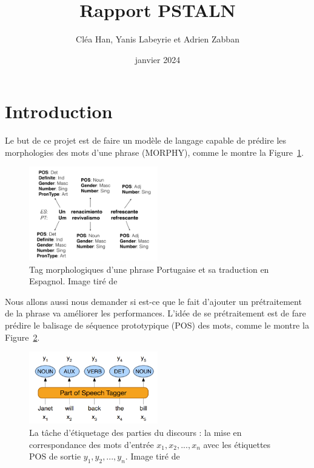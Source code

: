 \documentclass[a4paper]{article}
\title{Rapport PSTALN}
\author{Cléa Han, Yanis Labeyrie et Adrien Zabban}
\date{janvier 2024}
\begin{document}
\maketitle
\tableofcontents

\section{Introduction}

Le but de ce projet est de faire un modèle de langage capable de prédire les morphologies des mots d'une phrase
(MORPHY), comme le montre la Figure~\ref{fig: example morphy}.

\begin{figure}[H]
    \centering
    \includegraphics[width=0.5\textwidth]{morphy.png}
    \caption{Tag morphologiques d'une phrase Portugaise et sa traduction en Espagnol.
    Image tiré de~\cite{malaviya-etal-2018-neural}}
    \label{fig: example morphy}
\end{figure}    

Nous allons aussi nous demander si est-ce que le fait d'ajouter un prétraitement de la phrase va améliorer
les performances. L'idée de se prétraitement est de fare prédire le balisage de séquence
prototypique (POS) des mots, comme le montre la Figure~\ref{fig: example pos}.

\begin{figure}[H]
    \centering
    \includegraphics[width=0.5\textwidth]{pos.png}
    \caption{La tâche d'étiquetage des parties du discours : la mise en correspondance des mots d'entrée 
    $x_1, x_2,..., x_n$ avec les étiquettes POS de sortie $y_1, y_2,..., y_n$.
    Image tiré de~\cite{pos}}
    \label{fig: example pos}
\end{figure} 
\end{document}

